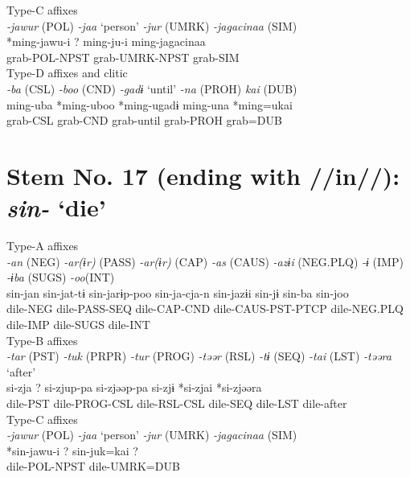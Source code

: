 \ex Type-C affixes\\
\glll \textit{-jawur} (POL)  \textit{-jaa} ‘person’  \textit{-jur} (UMRK)  \textit{-jagacinaa} (SIM)\\
*ming-jawu-i  ?  ming-ju-i  ming-jagacinaa\\
grab-POL-NPST    grab-UMRK-NPST  grab-SIM\\


\ex Type-D affixes and clitic\\
\glll \textit{-ba} (CSL)  \textit{-boo} (CND)  \textit{-gadɨ} ‘until’  \textit{-na} (PROH)  \textit{kai} (DUB)\\
ming-uba  *ming-uboo  *ming-ugadɨ  ming-una  *ming=ukai\\
grab-CSL  grab-CND  grab-until  grab-PROH  grab=DUB\\
\z

\section{Stem No. 17 (ending with //in//): \textit{sin-} ‘die’}

\ea Type-A affixes\\
\glll \textit{-an} (NEG)  \textit{-ar(ɨr)} (PASS)  \textit{-ar(ɨr)} (CAP)  \textit{-as} (CAUS)  \textit{-azɨi} (NEG.PLQ)  \textit{-ɨ} (IMP)  \textit{-ɨba} (SUGS)  \textit{-oo}(INT)\\
sin-jan  sin-jat-tɨ  sin-jarɨp-poo  sin-ja-cja-n  sin-jazɨi  sin-jɨ  sin-ba  sin-joo\\
dile-NEG  dile-PASS-SEQ  dile-CAP-CND  dile-CAUS-PST-PTCP  dile-NEG.PLQ  dile-IMP  dile-SUGS  dile-INT\\


\ex Type-B affixes\\
\glll \textit{-tar} (PST)  \textit{-tuk} (PRPR)  \textit{-tur} (PROG)  \textit{-təər} (RSL)  \textit{-tɨ} (SEQ)  \textit{-tai} (LST)  \textit{-təəra} ‘after’\\
si-zja  ?  si-zjup-pa  si-zjəəp-pa  si-zjɨ  *si-zjai  *si-zjəəra\\
dile-PST    dile-PROG-CSL  dile-RSL-CSL  dile-SEQ  dile-LST  dile-after\\


\ex Type-C affixes\\
\glll \textit{-jawur} (POL)  \textit{-jaa} ‘person’  \textit{-jur} (UMRK)  \textit{-jagacinaa} (SIM)\\
*sin-jawu-i  ?  sin-juk=kai  ?\\
dile-POL-NPST    dile-UMRK=DUB  \\


